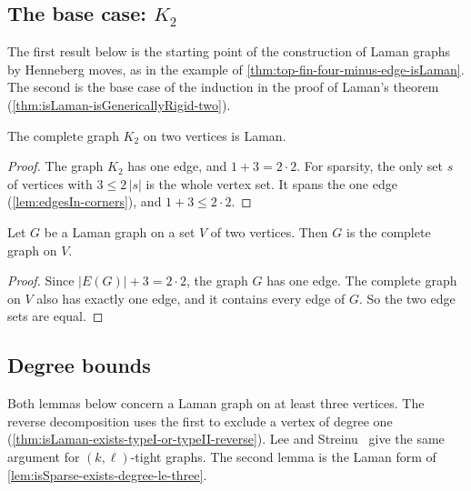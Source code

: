 \subsection{The base case: \texorpdfstring{$K_2$}{K2}}

The first result below is the starting point of the construction of
Laman graphs by Henneberg moves, as in the example of
\cref{thm:top-fin-four-minus-edge-isLaman}. The second is the base case
of the induction in the proof of Laman's theorem
(\cref{thm:isLaman-isGenericallyRigid-two}).

\begin{theorem}[$K_2$ is Laman]
  \label{thm:top-fin-two-isLaman}
  \leanok
  The complete graph $K_2$ on two vertices is Laman.
\end{theorem}
\begin{proof}
  \leanok
  The graph $K_2$ has one edge, and $1 + 3 = 2 \cdot 2$. For sparsity,
  the only set $s$ of vertices with $3 \le 2\,|s|$ is the whole vertex
  set. It spans the one edge (\cref{lem:edgesIn-corners}), and
  $1 + 3 \le 2 \cdot 2$.
\end{proof}

\begin{lemma}
  \label{lem:isLaman-eq-top-of-card-eq-two}
  \leanok
  Let $G$ be a Laman graph on a set $V$ of two vertices. Then $G$ is the
  complete graph on $V$.
\end{lemma}
\begin{proof}
  \leanok
  Since $|E(G)| + 3 = 2 \cdot 2$, the graph $G$ has one edge. The
  complete graph on $V$ also has exactly one edge, and it contains
  every edge of $G$. So the two edge sets are equal.
\end{proof}

\subsection{Degree bounds}
\label{sec:laman-degrees}

Both lemmas below concern a Laman graph on at least three vertices.
The reverse decomposition uses the first to exclude a vertex of degree
one (\cref{thm:isLaman-exists-typeI-or-typeII-reverse}). Lee and
Streinu~\cite[Lemma~4]{leeStreinu2008} give the same argument for
$(k,\ell)$-tight graphs. The second lemma is the Laman form of
\cref{lem:isSparse-exists-degree-le-three}.

